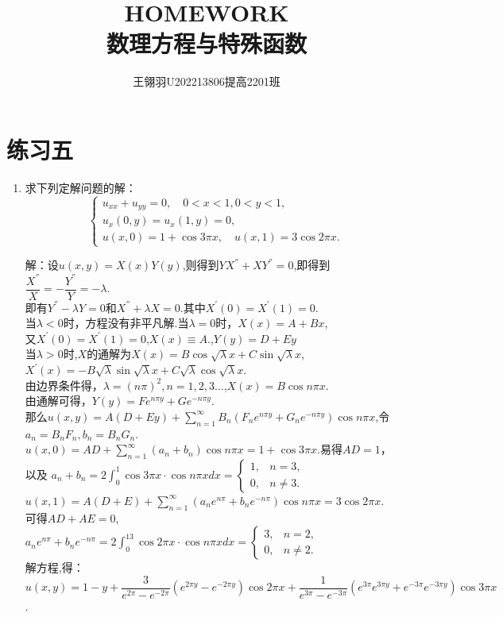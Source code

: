 \documentclass[11pt]{article}
\begin{document}
\title{\vspace{-2cm}HOMEWORK\\ 数理方程与特殊函数}
\author{王翎羽\quad U202213806\quad 提高2201班}
\maketitle

\section*{练习五}
\begin{enumerate}
    \item 求下列定解问题的解：
     \begin{equation*}
        \left\{
         \begin{array}{lr}
         u_{xx}+u_{yy}=0, \quad 0<x<1,0<y<1,  \\
         u_x(0,y)=u_x(1,y)=0, \\
         u(x,0)=1+\cos 3\pi x,\quad u(x,1)=3\cos2\pi x.
         \end{array}
        \right.
     \end{equation*}

    解：设$u(x,y)=X(x)Y(y)$,则得到$YX^{''}+XY^{''}=0$,即得到$\dfrac{X^{''}}{X}=-\dfrac{Y^{''}}{Y}=-\lambda$.\\即有$Y^{''}-\lambda Y=0$和$X^{''}+\lambda X=0$.其中$X^{'}(0)=X^{'}(1)=0.$\\当$\lambda < 0 $时，方程没有非平凡解.当$\lambda = 0 $时，$X(x)=A+Bx$,\\又$X^{'}(0)=X^{'}(1)=0$,$X(x)\equiv A.$,$Y(y)=D+Ey$\\当$\lambda > 0 $时,$X$的通解为$X(x)=B\cos\sqrt {\lambda}x+C\sin\sqrt {\lambda}x$,$X^{'}(x)=-B\sqrt {\lambda}\sin\sqrt {\lambda}x+C\sqrt {\lambda}\cos\sqrt {\lambda}x$.\\由边界条件得，$\lambda = (n\pi)^2,n=1,2,3\dots$,$X(x)=B\cos n\pi x$.\\由通解可得，$Y(y)=Fe^{n\pi y}+Ge^{-n\pi y}$.\\那么$u(x,y)=A(D+Ey)+\sum\limits_{n=1}^{\infty}B_n(F_ne^{n\pi y}+G_ne^{-n\pi y})\cos n\pi x$,令$a_n=B_{n}F_n,b_n=B_{n}G_n$.\\$u(x,0)=AD+\sum\limits_{n=1}^{\infty}(a_n+b_n)\cos n\pi x=1+\cos 3\pi x$.易得$AD=1$，\\以及
        $a_n+b_n=2\int_0^1\cos 3\pi x\cdot \cos n\pi xdx=\begin{cases} 1,&n=3,\\0,&n\neq 3.\end{cases}$\\$u(x,1)=A(D+E)+\sum\limits_{n=1}^{\infty}(a_ne^{n\pi}+b_ne^{-n\pi})\cos n\pi x=3\cos 2\pi x$.\\可得$AD+AE=0$,$a_ne^{n\pi}+b_ne^{-n\pi}=2\int_0^{13}\cos 2\pi x\cdot \cos n\pi xdx=\begin{cases} 3,&n=2,\\0,&n\neq 2.\end{cases}$\\解方程,得：$u(x,y)=1-y+\dfrac{3}{e^{2\pi }-e^{-2\pi }}(e^{2\pi y}-e^{-2\pi y})\cos 2\pi x+\dfrac{1}{e^{3\pi }-e^{-3\pi }}(e^{3\pi}e^{3\pi y}+e^{-3\pi}e^{-3\pi y})\cos 3\pi x$.



\end{enumerate}
\end{document}
